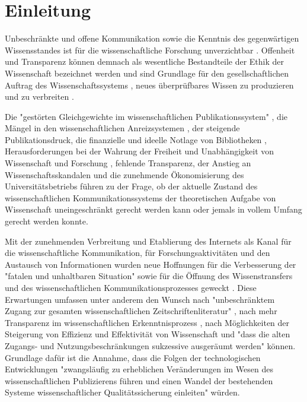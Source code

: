 \chapter{Einleitung}

Unbeschränkte und offene Kommunikation sowie die Kenntnis des gegenwärtigen Wissensstandes ist für die wissenschaftliche Forschung unverzichtbar \cite{glaeser2006} \cite{gibbons_1994}. Offenheit und Transparenz können demnach als wesentliche Bestandteile der Ethik der Wissenschaft bezeichnet werden \cite{Peters_2014} \cite{resnik_2005_ethics} und sind Grundlage für den gesellschaftlichen Auftrag des Wissenschaftssystems \cite[:3]{Hanekop_2014}, neues überprüfbares Wissen zu produzieren und zu verbreiten \cite[:551]{Luescher_2014} \cite[:298]{Luhmann1998} \cite[:100]{graefen2007_wissenschaftliche_artikel}.

Die "gestörten Gleichgewichte im wissenschaftlichen Publikationssystem" \cite{cite:0}, die Mängel in den wissenschaftlichen Anreizsystemen \cite{osterloh2008anreize}, der steigende Publikationsdruck, die finanzielle und ideelle Notlage von Bibliotheken \cite{russell_2008_business} \cite{Sietmann_oa_2007}, Herausforderungen bei der Wahrung der Freiheit und Unabhängigkeit von Wissenschaft und Forschung \cite{Goetting_2015}, fehlende Transparenz, der Anstieg an Wissenschaftsskandalen \cite{brembs2015open} und die zunehmende Ökonomisierung des Universitätsbetriebs \cite{bauer2006} führen zu der Frage, ob der aktuelle Zustand des wissenschaftlichen Kommunikationssystems der theoretischen Aufgabe von Wissenschaft uneingeschränkt gerecht werden kann \cite{Schekman_2013} oder jemals in vollem Umfang gerecht werden konnte.

Mit der zunehmenden Verbreitung und Etablierung des Internets als Kanal für die wissenschaftliche Kommunikation, für Forschungsaktivitäten und den Austausch von Informationen wurden neue Hoffnungen für die Verbesserung der "fatalen und unhaltbaren Situation" \cite{brembs2015open} sowie für die Öffnung des Wissenstransfers \cite{schulze_2013_open} \cite{albert_2006_open_implications} und des wissenschaftlichen Kommunikationsprozesses geweckt \cite{Hanekop_2014} \cite{EuropeanCommission_sciencepub_2006} \cite{Goodrum_2001} \cite{Lawrence_1999}. Diese Erwartungen umfassen unter anderem den Wunsch nach "unbeschränktem Zugang zur gesamten wissenschaftlichen Zeitschriftenliteratur" \cite{boai_2002}, nach mehr Transparenz im wissenschaftlichen Erkenntnisprozess \cite{eu_agenda_open_science_2015}, nach Möglichkeiten der Steigerung von Effizienz und Effektivität von Wissenschaft \cite{Partha_1994_economics_science} und "dass die alten Zugangs- und Nutzungsbeschränkungen sukzessive ausgeräumt werden" \cite{boai_2002} können. Grundlage dafür ist die Annahme, dass die Folgen der technologischen Entwicklungen "zwangsläufig zu erheblichen Veränderungen im Wesen des wissenschaftlichen Publizierens führen und einen Wandel der bestehenden Systeme wissenschaftlicher Qualitätssicherung einleiten" \cite{berliner_erklaerung_2003} würden.

